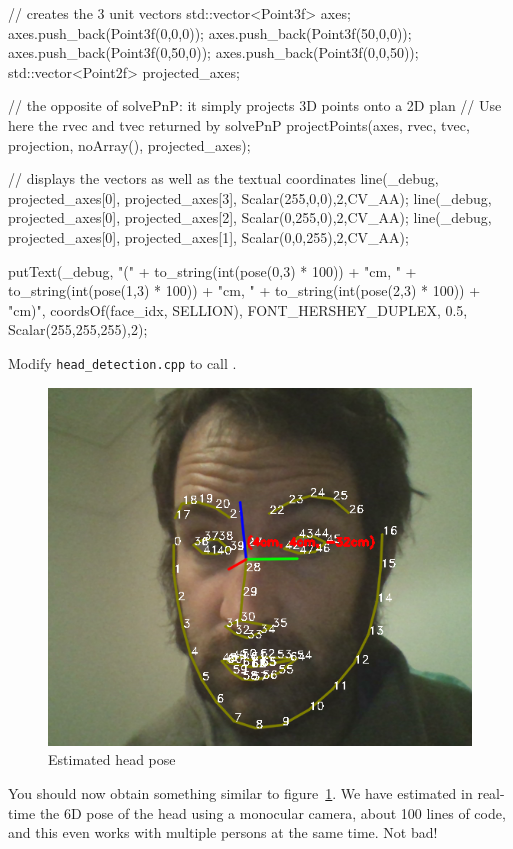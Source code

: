\documentclass{instructions}
\begin{document}
\begin{cppcode}
// creates the 3 unit vectors
std::vector<Point3f> axes;
axes.push_back(Point3f(0,0,0));
axes.push_back(Point3f(50,0,0));
axes.push_back(Point3f(0,50,0));
axes.push_back(Point3f(0,0,50));
std::vector<Point2f> projected_axes;

// the opposite of solvePnP: it simply projects 3D points onto a 2D plan
// Use here the rvec and tvec returned by solvePnP
projectPoints(axes, rvec, tvec, projection, noArray(), projected_axes);

// displays the vectors as well as the textual coordinates
line(_debug, projected_axes[0], projected_axes[3], Scalar(255,0,0),2,CV_AA);
line(_debug, projected_axes[0], projected_axes[2], Scalar(0,255,0),2,CV_AA);
line(_debug, projected_axes[0], projected_axes[1], Scalar(0,0,255),2,CV_AA);

putText(_debug, "(" + to_string(int(pose(0,3) * 100)) + "cm, " 
                    + to_string(int(pose(1,3) * 100)) + "cm, " 
                    + to_string(int(pose(2,3) * 100)) + "cm)", 
        coordsOf(face_idx, SELLION), 
        FONT_HERSHEY_DUPLEX, 0.5, Scalar(255,255,255),2);

\end{cppcode}

Modify {\tt head\_detection.cpp} to call .


\begin{figure}[h!]
    \centering
    \includegraphics[width=0.6\linewidth]{figs/head_pose}
    \caption{Estimated head pose}
    \label{head_pose}
\end{figure}

You should now obtain something similar to figure~\ref{head_pose}. We have
estimated in real-time the 6D pose of the head using a monocular camera,
about 100 lines of code, and this even works with multiple persons at the same
time. Not bad!
\end{document}
